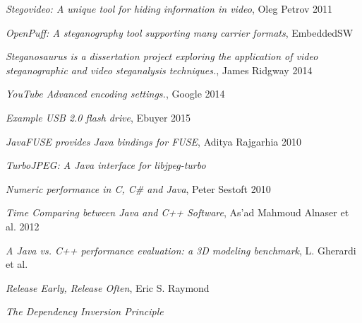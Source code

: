 \documentclass[paper=a4, fontsize=11pt,twoside]{scrartcl}
\numberwithin{table}{section}
\numberwithin{figure}{section}
\numberwithin{algorithm}{section}
\begin{document}
\begin{thebibliography}{1}
 \emph{Stegovideo: A unique tool for hiding information in video}, Oleg Petrov 2011\\

 \emph{OpenPuff: A steganography tool supporting many carrier formats}, EmbeddedSW\\

 \emph{Steganosaurus is a dissertation project exploring the application of video steganographic and video steganalysis techniques.}, James Ridgway 2014\\

 \emph{YouTube Advanced encoding settings.}, Google 2014\\

 \emph{Example USB 2.0 flash drive}, Ebuyer 2015\\

 \emph{JavaFUSE provides Java bindings for FUSE}, Aditya Rajgarhia 2010\\

 \emph{TurboJPEG: A Java interface for libjpeg-turbo}\\

 \emph{Numeric performance in C, C\# and Java}, Peter Sestoft 2010\\
 
 \emph{Time Comparing between Java and C++ Software}, As’ad Mahmoud Alnaser et al. 2012\\
 
 \emph{A Java vs. C++ performance evaluation: a 3D modeling benchmark}, L. Gherardi et al.\\

 \emph{Release Early, Release Often}, Eric S. Raymond \\

 \emph{The Dependency Inversion Principle}\\


\end{thebibliography}
\end{document}
